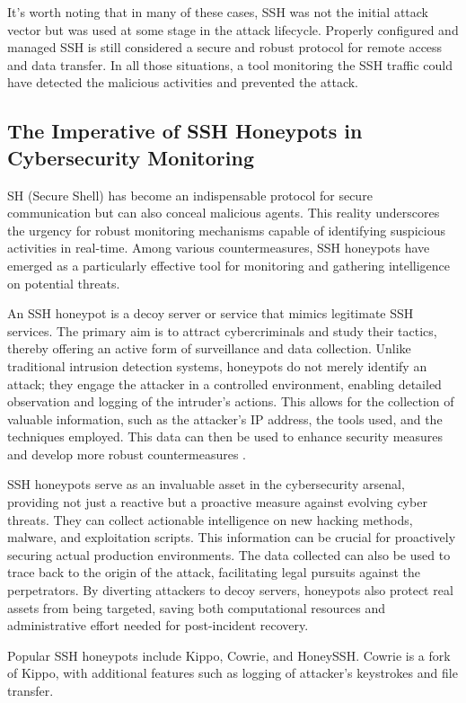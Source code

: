     It's worth noting that in many of these cases, SSH was not the initial attack vector but was used at some stage in the attack lifecycle. Properly configured and managed SSH is still considered a secure and robust protocol for remote access and data transfer. In all those situations, a tool monitoring the SSH traffic could have detected the malicious activities and prevented the attack.

    \subsection{The Imperative of SSH Honeypots in Cybersecurity Monitoring}
    SH (Secure Shell) has become an indispensable protocol for secure communication but can also conceal malicious agents. This reality underscores the urgency for robust monitoring mechanisms capable of identifying suspicious activities in real-time. Among various countermeasures, SSH honeypots have emerged as a particularly effective tool for monitoring and gathering intelligence on potential threats. 

    An SSH honeypot is a decoy server or service that mimics legitimate SSH services. The primary aim is to attract cybercriminals and study their tactics, thereby offering an active form of surveillance and data collection. Unlike traditional intrusion detection systems, honeypots do not merely identify an attack; they engage the attacker in a controlled environment, enabling detailed observation and logging of the intruder's actions. This allows for the collection of valuable information, such as the attacker's IP address, the tools used, and the techniques employed. This data can then be used to enhance security measures and develop more robust countermeasures \cite{ClassificationMalware21}. 

    SSH honeypots serve as an invaluable asset in the cybersecurity arsenal, providing not just a reactive but a proactive measure against evolving cyber threats. They can collect actionable intelligence on new hacking methods, malware, and exploitation scripts. This information can be crucial for proactively securing actual production environments. The data collected can also be used to trace back to the origin of the attack, facilitating legal pursuits against the perpetrators. By diverting attackers to decoy servers, honeypots also protect real assets from being targeted, saving both computational resources and administrative effort needed for post-incident recovery.

    Popular SSH honeypots include Kippo, Cowrie, and HoneySSH.  Cowrie is a fork of Kippo, with additional features such as logging of attacker's keystrokes and file transfer. 

